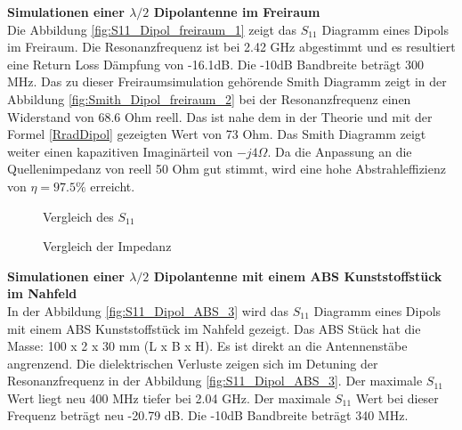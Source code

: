 \textbf{Simulationen einer $\lambda/2$ Dipolantenne im Freiraum}\\
Die Abbildung \ref{fig:S11_Dipol_freiraum_1} zeigt das $S_{11}$ Diagramm eines Dipols im Freiraum. Die Resonanzfrequenz ist bei 2.42 GHz abgestimmt und es resultiert eine Return Loss Dämpfung von -16.1dB.  Die -10dB Bandbreite beträgt 300 MHz. Das zu dieser Freiraumsimulation gehörende Smith Diagramm zeigt in der Abbildung \ref{fig:Smith_Dipol_freiraum_2}  bei der Resonanzfrequenz einen Widerstand von 68.6 Ohm reell. Das ist nahe dem in der Theorie und mit der Formel \ref{RradDipol} gezeigten Wert von 73 Ohm. Das Smith Diagramm zeigt weiter einen kapazitiven  Imaginärteil von $-j4\Omega$. Da die Anpassung an die Quellenimpedanz von reell 50 Ohm gut stimmt, wird eine hohe Abstrahleffizienz von $\eta = 97.5 \% $ erreicht.
\begin{figure}[!ht]
	\centering
	\begingroup
	
	\endgroup
	\caption{Vergleich des $S_{11}$}
	\label{S11_Vergleich_Simulation}
\end{figure}
\begin{figure}[!ht]
	\centering
	\begingroup
	
	\endgroup
	\caption{Vergleich der Impedanz}
	\label{Impedanz_Vergleich_Simulation}
\end{figure}

\textbf{Simulationen einer $\lambda/2$ Dipolantenne mit einem ABS Kunststoffstück im Nahfeld}\\

In der Abbildung \ref{fig:S11_Dipol_ABS_3} wird das $S_{11}$ Diagramm eines Dipols mit einem ABS Kunststoffstück im Nahfeld gezeigt. Das ABS Stück hat die Masse: 100 x 2 x 30 mm (L x B x H). Es ist direkt an die Antennenstäbe angrenzend. Die dielektrischen Verluste zeigen sich im Detuning der Resonanzfrequenz in der Abbildung \ref{fig:S11_Dipol_ABS_3}. Der maximale $S_{11}$ Wert liegt neu 400 MHz tiefer bei 2.04 GHz. Der maximale $S_{11}$ Wert bei dieser Frequenz beträgt  neu -20.79 dB. Die -10dB Bandbreite beträgt 340 MHz.\\

